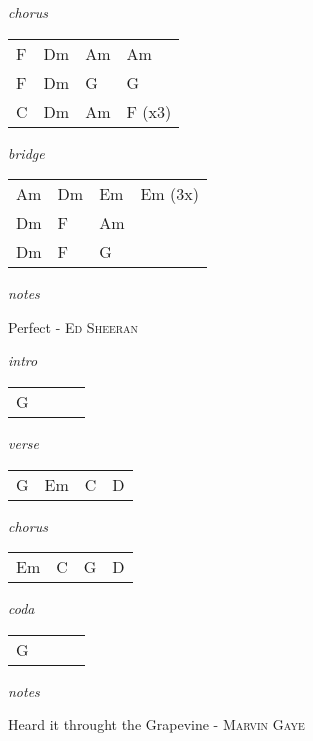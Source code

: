 \documentclass[12pt]{article}
\begin{document}
\textit{chorus}

\begin{tabular}{|P{1.25in}|P{1.25in}|P{1.25in}|P{1.25in}|}
  F & Dm  & Am  & Am  \\
  F & Dm  & G  & G  \\
  C & Dm & Am & F (x3) \\
\end{tabular}

\textit{bridge}

\begin{tabular}{|P{1.25in}|P{1.25in}|P{1.25in}|P{1.25in}|}
  Am & Dm  &  Em & Em (3x) \\
  Dm &  F   &  Am &   \\
  Dm &  F   &  G  &  \\
\end{tabular}

\textit{notes}

\newpage

{\Huge Perfect} {\huge - \textsc{Ed Sheeran}}

\huge
\textit{intro}

\begin{tabular}{|P{1.25in}|P{1.25in}|P{1.25in}|P{1.25in}|}
  G &   &   &   \\
\end{tabular}

\textit{verse}

\begin{tabular}{|P{1.25in}|P{1.25in}|P{1.25in}|P{1.25in}|}
  G &  Em & C  & D  \\
\end{tabular}

\textit{chorus}

\begin{tabular}{|P{1.25in}|P{1.25in}|P{1.25in}|P{1.25in}|}
  Em &  C &  G &  D \\
\end{tabular}

\textit{coda}

\begin{tabular}{|P{1.25in}|P{1.25in}|P{1.25in}|P{1.25in}|}
  G &   &   &   \\
\end{tabular}

\textit{notes}

\newpage

{\Huge Heard it throught the Grapevine} {\huge - \textsc{Marvin Gaye}}
\end{document}

